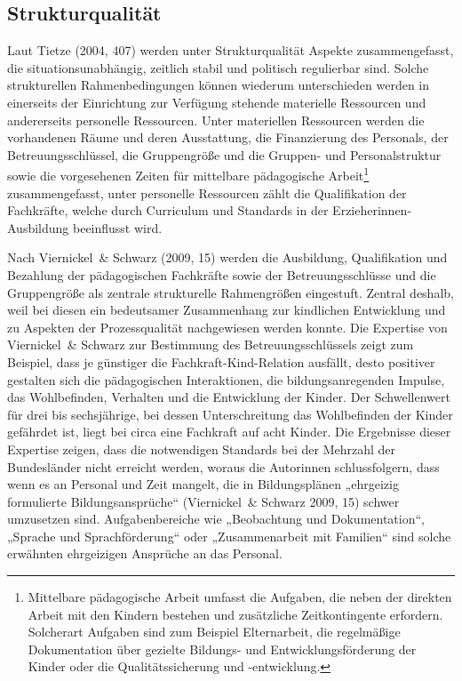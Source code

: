 \subsection{Strukturqualität}
\label{subsec:Strukturquali}
Laut Tietze (2004, 407) werden unter Strukturqualität Aspekte zusammengefasst, die situationsunabhängig, zeitlich stabil und politisch regulierbar sind. Solche strukturellen Rahmenbedingungen können wiederum unterschieden werden in einerseits der Einrichtung zur Verfügung stehende materielle Ressourcen und andererseits personelle Ressourcen. Unter materiellen Ressourcen werden die vorhandenen Räume und deren Ausstattung, die Finanzierung des Personals, der Betreuungsschlüssel, die Gruppengröße und die Gruppen- und Personalstruktur sowie die vorgesehenen Zeiten für mittelbare pädagogische Arbeit\footnote{ Mittelbare pädagogische Arbeit umfasst die Aufgaben, die neben der direkten Arbeit mit den Kindern bestehen und zusätzliche Zeitkontingente erfordern. Solcherart Aufgaben sind zum Beispiel Elternarbeit, die regelmäßige Dokumentation über gezielte Bildungs- und Entwicklungsförderung der Kinder oder  die Qualitätssicherung und -entwicklung.} zusammengefasst, unter personelle Ressourcen zählt die Qualifikation der Fachkräfte, welche durch Curriculum und Standards in der Erzieherinnen-Ausbildung beeinflusst wird. 

Nach Viernickel~\& Schwarz (2009, 15) werden die Ausbildung, Qualifikation und Bezahlung der pädagogischen Fachkräfte sowie der Betreuungsschlüsse und die Gruppengröße als zentrale strukturelle Rahmengrößen eingestuft. Zentral deshalb, weil bei diesen ein bedeutsamer Zusammenhang zur kindlichen Entwicklung und zu Aspekten der Prozessqualität nachgewiesen werden konnte. 
Die Expertise von Viernickel~\& Schwarz zur Bestimmung des Betreuungsschlüssels zeigt zum Beispiel, dass je günstiger die Fachkraft-Kind-Relation ausfällt, desto positiver gestalten sich die pädagogischen Interaktionen, die bildungsanregenden Impulse, das Wohlbefinden, Verhalten und die Entwicklung der Kinder. Der Schwellenwert für drei bis sechsjährige, bei dessen Unterschreitung das Wohlbefinden der Kinder gefährdet ist, liegt bei circa eine Fachkraft auf acht Kinder. Die Ergebnisse dieser Expertise zeigen, dass die notwendigen Standards bei der Mehrzahl der Bundesländer nicht erreicht werden, woraus die Autorinnen schlussfolgern, dass wenn es an Personal und Zeit mangelt, die in Bildungsplänen „ehrgeizig formulierte Bildungsansprüche“ (Viernickel~\& Schwarz 2009, 15) schwer umzusetzen sind. Aufgabenbereiche wie „Beobachtung und Dokumentation“, „Sprache und Sprachförderung“ oder „Zusammenarbeit mit Familien“ sind solche erwähnten ehrgeizigen Ansprüche an das Personal.

